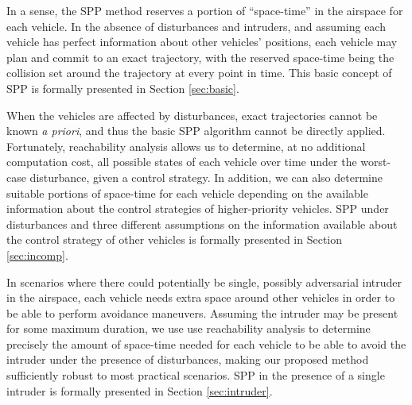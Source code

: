 In a sense, the SPP method reserves a portion of ``space-time'' in the airspace for each vehicle. In the absence of disturbances and intruders, and assuming each vehicle has perfect information about other vehicles' positions, each vehicle may plan and commit to an exact trajectory, with the reserved space-time being the collision set around the trajectory at every point in time. This basic concept of SPP is formally presented in Section \ref{sec:basic}.

When the vehicles are affected by disturbances, exact trajectories cannot be known \textit{a priori}, and thus the basic SPP algorithm cannot be directly applied. Fortunately, reachability analysis allows us to determine, at no additional computation cost, all possible states of each vehicle over time under the worst-case disturbance, given a control strategy. In addition, we can also determine suitable portions of space-time for each vehicle depending on the available information about the control strategies of higher-priority vehicles. SPP under disturbances and three different assumptions on the information available about the control strategy of other vehicles is formally presented in Section \ref{sec:incomp}.

In scenarios where there could potentially be single, possibly adversarial intruder in the airspace, each vehicle needs extra space around other vehicles in order to be able to perform avoidance maneuvers. Assuming the intruder may be present for some maximum duration, we use use reachability analysis to determine precisely the amount of space-time needed for each vehicle to be able to avoid the intruder under the presence of disturbances, making our proposed method sufficiently robust to most practical scenarios. SPP in the presence of a single intruder is formally presented in Section \ref{sec:intruder}.

